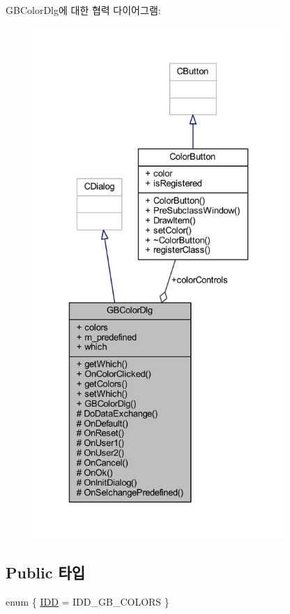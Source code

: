 G\+B\+Color\+Dlg에 대한 협력 다이어그램\+:\nopagebreak
\begin{figure}[H]
\begin{center}
\leavevmode
\includegraphics[height=550pt]{class_g_b_color_dlg__coll__graph}
\end{center}
\end{figure}
\subsection*{Public 타입}
\begin{DoxyCompactItemize}
\item 
enum \{ \mbox{\hyperlink{class_g_b_color_dlg_a0521b97d21035c132d3dba9bc818837aa01c90b6607907f62141ba86d0eca589e}{I\+DD}} = I\+D\+D\+\_\+\+G\+B\+\_\+\+C\+O\+L\+O\+RS
 \}
\end{DoxyCompactItemize}
